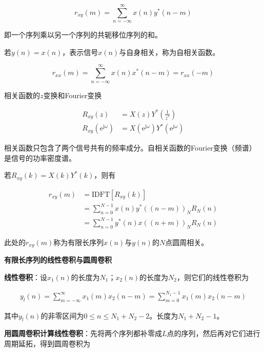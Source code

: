 \documentclass[cn, hazy, blue, normal, 12pt]{elegantnote}
\begin{document}
\begin{equation}
    r_{xy}(m)=\sum_{n=-\infty}^{\infty}{x(n)y^*(n-m)}
\end{equation}

即一个序列乘以另一个序列的共轭移位序列的和。

若$y(n)=x(n)$，表示信号$x(n)$与自身相关，称为自相关函数。

\begin{equation}
    r_{xx}(m)=\sum_{n=-\infty}^{\infty}{x(n)x^*(n-m)}=r_{xx}(-m)
\end{equation}

相关函数的$z$变换和Fourier变换

\begin{equation}
\begin{aligned}
    R_{xy}(z)&=X(z)Y^*\left(\frac{1}{z^*}\right) \\
    R_{xy}(\text{e}^{\text{j}\omega})&=X(\text{e}^{\text{j}\omega})Y^*(\text{e}^{\text{j}\omega})
\end{aligned}
\end{equation}

相关函数只包含了两个信号共有的频率成分。自相关函数的Fourier变换（频谱）是信号的功率密度谱。

若$R_{xy}(k)=X(k)Y^*(k)$，则有

\begin{equation}
\begin{aligned}
    r_{xy}(m)&=\text{IDFT}[R_{xy}(k)] \\
    &=\sum_{n=0}^{N-1}{x(n)y^*((n-m))_N R_N(n)} \\
    &=\sum_{n=0}^{N-1}{y^*(n)x((n+m))_N R_N(n)} 
\end{aligned}
\end{equation}

此处的$r_{xy}(m)$称为有限长序列$x(n)$与$y(n)$的$N$点圆周相关。

\textbf{有限长序列的线性卷积与圆周卷积}

\textbf{线性卷积}：设$x_1(n)$的长度为$N_1$；$x_2(n)$的长度为$N_2$，则它们的线性卷积为

\begin{equation}
\begin{aligned}
    y_l(n)=\sum_{m=-\infty}^{\infty}{x_1(m)x_2(n-m)}=\sum_{m=0}^{N_1-1}{x_1(m)x_2(n-m)}
\end{aligned}
\end{equation}

其中$y_l(n)$的非零区间为$0\leq n\leq N_1+N_2-2$。长度为$N_1+N_2-1$。

\textbf{用圆周卷积计算线性卷积}：先将两个序列都补零成$L$点的序列，然后再对它们进行周期延拓，得到圆周卷积为
\end{document}
